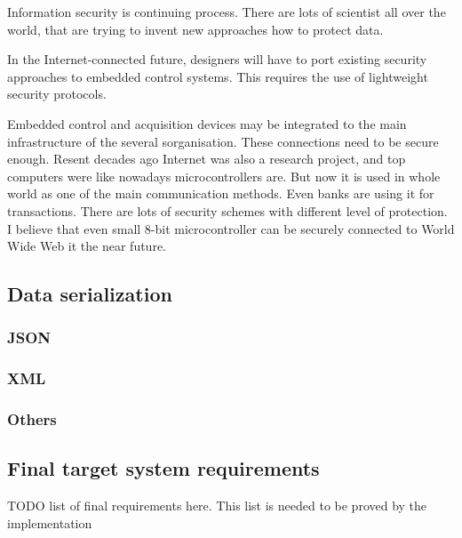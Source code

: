 Information security is continuing process. There are lots of scientist all
over the world, that are trying to invent new approaches how to protect data.

In the Internet-connected future, designers will have to port existing
security approaches to embedded control systems. This requires the use of 
lightweight security protocols.

Embedded control and acquisition devices may be integrated to the main
infrastructure of the several sorganisation. These connections need to be secure
enough.
Resent decades ago Internet was also a research project, and top computers were
like nowadays microcontrollers are. But now it is used in whole world as one of
the main communication methods. Even banks are using it for transactions. There are
lots of security schemes with different level of protection. I believe that
even small 8-bit microcontroller can be securely connected to World Wide Web it
the near future.



\subsection{Data serialization}
\subsubsection{JSON}
\subsubsection{XML}
\subsubsection{Others}

\subsection{Final target system requirements}
TODO list of final requirements here. This list is needed to be proved by the
implementation
